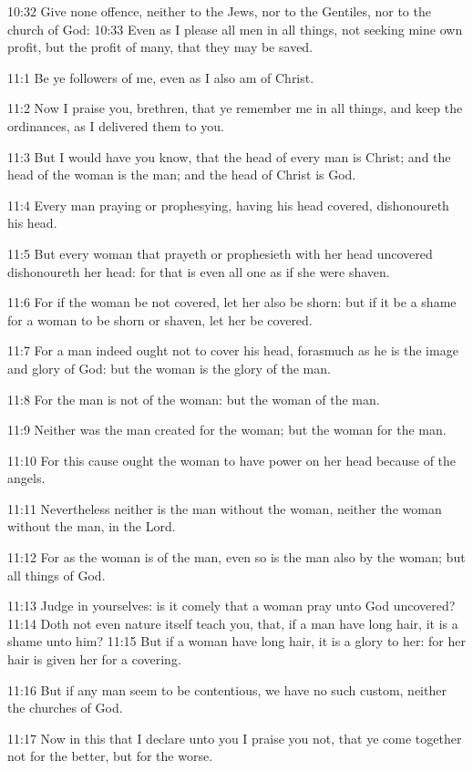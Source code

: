 10:32 Give none offence, neither to the Jews, nor to the Gentiles, nor
to the church of God: 10:33 Even as I please all men in all things,
not seeking mine own profit, but the profit of many, that they may be
saved.

11:1 Be ye followers of me, even as I also am of Christ.

11:2 Now I praise you, brethren, that ye remember me in all things,
and keep the ordinances, as I delivered them to you.

11:3 But I would have you know, that the head of every man is Christ;
and the head of the woman is the man; and the head of Christ is God.

11:4 Every man praying or prophesying, having his head covered,
dishonoureth his head.

11:5 But every woman that prayeth or prophesieth with her head
uncovered dishonoureth her head: for that is even all one as if she
were shaven.

11:6 For if the woman be not covered, let her also be shorn: but if it
be a shame for a woman to be shorn or shaven, let her be covered.

11:7 For a man indeed ought not to cover his head, forasmuch as he is
the image and glory of God: but the woman is the glory of the man.

11:8 For the man is not of the woman: but the woman of the man.

11:9 Neither was the man created for the woman; but the woman for the
man.

11:10 For this cause ought the woman to have power on her head because
of the angels.

11:11 Nevertheless neither is the man without the woman, neither the
woman without the man, in the Lord.

11:12 For as the woman is of the man, even so is the man also by the
woman; but all things of God.

11:13 Judge in yourselves: is it comely that a woman pray unto God
uncovered?  11:14 Doth not even nature itself teach you, that, if a
man have long hair, it is a shame unto him?  11:15 But if a woman have
long hair, it is a glory to her: for her hair is given her for a
covering.

11:16 But if any man seem to be contentious, we have no such custom,
neither the churches of God.

11:17 Now in this that I declare unto you I praise you not, that ye
come together not for the better, but for the worse.

